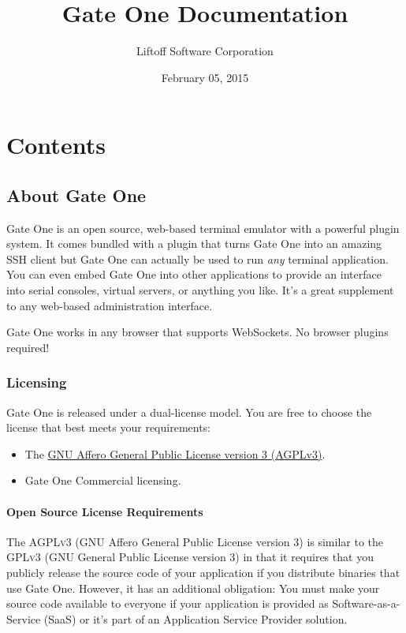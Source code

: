 \documentclass[letterpaper,10pt,openany]{sphinxmanual}
\title{Gate One Documentation}
\date{February 05, 2015}
\author{Liftoff Software Corporation}
\begin{document}
\maketitle
\tableofcontents
{}\label{index::doc}



\chapter{Contents}
\label{index:gate-one-documentation}\label{index:contents}

\section{About Gate One}
\label{About/index:about-gate-one}\label{About/index::doc}
Gate One is an open source, web-based terminal emulator with a powerful plugin system.  It comes bundled with a plugin that turns Gate One into an amazing SSH client but Gate One can actually be used to run \emph{any} terminal application.  You can even embed Gate One into other applications to provide an interface into serial consoles, virtual servers, or anything you like.  It's a great supplement to any web-based administration interface.

Gate One works in any browser that supports WebSockets.  No browser plugins required!


\subsection{Licensing}
\label{About/licensing::doc}\label{About/licensing:licensing}
Gate One is released under a dual-license model.  You are free to choose the license that best meets your requirements:
\begin{itemize}
\item {} 
The \href{http://www.gnu.org/licenses/agpl.html}{GNU Affero General Public License version 3 (AGPLv3)}.

\item {} 
Gate One Commercial licensing.

\end{itemize}


\subsubsection{Open Source License Requirements}
\label{About/licensing:open-source-license-requirements}
The \textsc{AGPLv3} (GNU Affero General Public License version 3) is similar to the \textsc{GPLv3} (GNU General Public License version 3) in that it requires that you publicly release the source code of your application if you distribute binaries that use Gate One.  However, it has an additional obligation:  You must make your source code available to everyone if your application is provided as Software-as-a-Service (SaaS) or it's part of an Application Service Provider solution.
\end{document}
